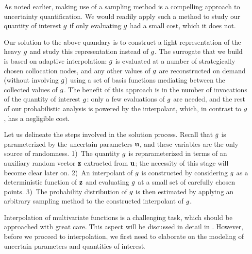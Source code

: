As noted earlier, making use of a sampling method is a compelling approach to
uncertainty quantification. We would readily apply such a method to study our
quantity of interest $g$ if only evaluating $g$ had a small cost, which it
does not.

Our solution to the above quandary is to construct a light representation of the
heavy $g$ and study this representation instead of $g$. The surrogate that we
build is based on adaptive interpolation: $g$ is evaluated at a number of
strategically chosen collocation nodes, and any other values of $g$ are
reconstructed on demand (without involving $g$) using a set of basis functions
mediating between the collected values of $g$. The benefit of this approach is
in the number of invocations of the quantity of interest $g$: only a few
evaluations of $g$ are needed, and the rest of our probabilistic analysis is
powered by the interpolant, which, in contrast to $g$, has a negligible cost.

Let us delineate the steps involved in the solution process. Recall that $g$ is
parameterized by the uncertain parameters $\mathbf{u}$, and these variables are the
only source of randomness. 1)~The quantity $g$ is reparameterized in terms of
an auxiliary random vector $\mathbf{z}$ extracted from $\mathbf{u}$; the necessity of this
stage will become clear later on. 2)~An interpolant of $g$ is constructed by
considering $g$ as a deterministic function of $\mathbf{z}$ and evaluating $g$ at a
small set of carefully chosen points. 3)~The probability distribution of $g$ is
then estimated by applying an arbitrary sampling method to the constructed
interpolant of $g$.

Interpolation of multivariate functions is a challenging task, which should be
approached with great care. This aspect will be discussed in detail in
. However, before we proceed to interpolation, we first need
to elaborate on the modeling of uncertain parameters and quantities of interest.
